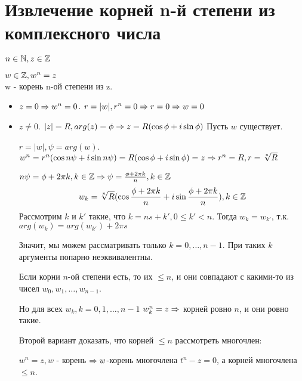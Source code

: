 \section{Извлечение корней n-й степени из комплексного числа}

$n \in \mathbb{N}, z \in \mathbb{Z}$

\begin{Def}
$w \in \mathbb{Z}, w^n = z$  \\
\hspace*{1cm} w - корень n-ой степени из z.
\end{Def}

\begin{itemize}
\item $z = 0 \Rightarrow w^n = 0$. $r = |w|, r^n = 0 \Rightarrow r = 0 \Rightarrow w = 0$
\item $z \ne 0$. $|z| = R, arg(z) = \phi \Rightarrow z = R(\cos \phi + i \sin \phi)$ Пусть $w$ существует. 

$r = |w|, \psi = arg(w)$. $w^n = r^n(\cos{n\psi} + i \sin{n\psi}) = R(\cos\phi + i \sin \phi) = z \Rightarrow r^n = R, r = \sqrt[n]{R}$ 

$n \psi = \phi + 2 \pi k, k \in \mathbb{Z} \Rightarrow \psi = \frac{\phi + 2 \pi k}{n}, k \in \mathbb{Z}$
$$w_k = \sqrt[n]{R}(\cos{\frac{\phi + 2 \pi k}{n}} + i \sin{\frac{\phi + 2 \pi k}{n}}), k \in \mathbb{Z}$$
Рассмотрим $k$ и $k'$ такие, что $k = ns + k', 0 \le k' < n$. Тогда $w_k = w_{k'}$, т.к. $arg(w_k) = arg(w_{k'}) + 2 \pi s$  

Значит, мы можем рассматривать только $k=0, \dots, n - 1$. При таких $k$ аргументы попарно неэквивалентны.

Если корни $n$-ой степени есть, то их $\le n$, и они совпадают с какими-то из чисел $w_0, w_1, \dots, w_{n - 1}$. 

Но для всех $w_k, k = 0, 1, \dots, n - 1$ $w_k^n = z \Rightarrow$ корней ровно $n$, и они ровно такие. 

Второй вариант доказать, что корней $\le n$ рассмотреть многочлен:

$w^n = z, w$ - корень $\Rightarrow w$-корень многочлена $t^n - z = 0$, а корней многочлена $\le n$. 
\end{itemize}